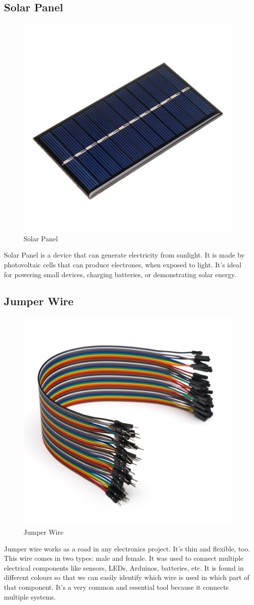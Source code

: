 \documentclass[conference]{IEEEtran}
\begin{document}
\subsection{Solar Panel}
\begin{figure}
    \centering
    \includegraphics[width=0.5\linewidth]{Solar Panel.png}
    \caption{Solar Panel}
    \label{fig:enter-label}
\end{figure}
Solar Panel is a device that can generate electricity from sunlight. It is made by photovoltaic cells that can  produce electrones, when exposed to light. It's ideal for powering small devices, charging batteries, or demonstrating solar energy.

\subsection{Jumper Wire}
\begin{figure}
    \centering
    \includegraphics[width=0.5\linewidth]{Wire.png}
    \caption{Jumper Wire}
    \label{fig:enter-label}
\end{figure}
Jumper wire works as a road in any electronics project. It’s thin and flexible, too. This wire comes in two types: male and female. It was used to connect multiple electrical components like sensors, LEDs, Arduinos, batteries, etc. It is found in different colours so that we can easily identify which wire is used in which part of that component. It's a very common and essential tool because it connects multiple systems.
\end{document}
